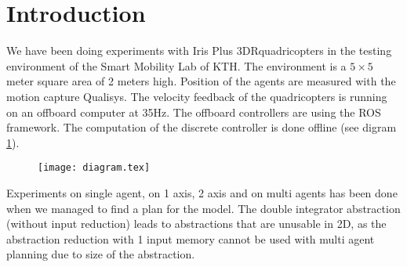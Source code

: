 \section{Introduction}
We have been doing experiments with Iris Plus 3DR\trademark quadricopters in the testing environment of the Smart Mobility Lab of KTH.
The environment is a $5\times5$ meter square area of 2 meters high.
Position of the agents are measured with the motion capture Qualisys\trademark.
The velocity feedback of the quadricopters is running on an offboard computer at 35Hz. The offboard controllers are using the ROS framework.
The computation of the discrete controller is done offline (see digram \ref{diagram}).

\begin{figure}
\texttt{[image: diagram.tex]}
\label{diagram}
\end{figure}

Experiments on single agent, on 1 axis, 2 axis and on multi agents has been done when we managed to find a plan for the model.
The double integrator abstraction (without input reduction) leads to abstractions that are unusable in 2D, as the abstraction reduction with 1 input memory cannot be used with multi agent planning due to size of the abstraction.
